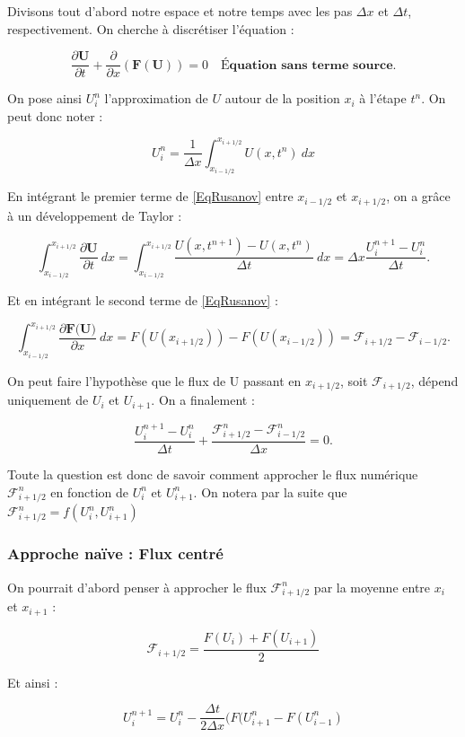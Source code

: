 \documentclass[
11pt, %
francais, %
singlespacing, %
headsepline, %
]{MastersDoctoralThesis} %
\begin{document}
Divisons tout d'abord notre espace et notre temps avec les pas $\Delta x$ et $\Delta t$, respectivement. On cherche à discrétiser l'équation : 

$$\frac{\partial\textbf{U}}{\partial t}+\frac{\partial}{\partial x}(\textbf{F} (\textbf{U})) = 0 \quad \textbf{Équation sans terme source} \label{EqRusanov} .$$

On pose ainsi $U_i ^n$ l'approximation de $U$ autour de la position $x_i$ à l'étape $t^n$. On peut donc noter :

$$ U_i ^n = \frac{1}{\Delta x}\int_{x_{i-1/2}}^{x_{i+1/2}} U(x,t^n) \ dx $$

En intégrant le premier terme de \ref{EqRusanov} entre $x_{i-1/2}$ et $x_{i+1/2}$, on a grâce à un développement de Taylor :

$$ \int_{x_{i-1/2}}^{x_{i+1/2}} \frac{\partial\textbf{U}}{\partial t} \ dx = \int_{x_{i-1/2}}^{x_{i+1/2}} \frac{U(x,t^{n+1}) - U(x,t^{n})}{\Delta t} \ dx = \Delta x \frac{ U_i ^{n+1} - U_i ^{n}}{\Delta t} .$$

Et en intégrant le second terme de \ref{EqRusanov} : 

$$ \int_{x_{i-1/2}}^{x_{i+1/2}} \frac{\partial\textbf{F(U)}}{\partial x} \ dx = F(U(x_{i+1/2})) - F(U(x_{i-1/2} )) = \mathcal{F}_{i+1/2} - \mathcal{F}_{i-1/2}.$$

On peut faire l'hypothèse que le flux de U passant en $x_{i+1/2}$, soit $\mathcal{F}_{i+1/2}$, dépend uniquement de $U_i$ et $U_{i+1}$. On a finalement :

$$ \frac{ U_i ^{n+1} - U_i ^{n}}{\Delta t} + \frac{ \mathcal{F}_{i+1/2} ^n - \mathcal{F}_{i-1/2} ^{n} }{\Delta x} = 0.$$

Toute la question est donc de savoir comment approcher le flux numérique $\mathcal{F}_{i+1/2} ^{n}$ en fonction de $U_i ^n$ et $U_{i+1} ^n$. On notera par la suite que $\mathcal{F}_{i+1/2} ^{n} = f(U_i ^n , U_{i+1} ^n)$

\subsubsection{Approche naïve : Flux centré }

On pourrait d'abord penser à approcher le flux $\mathcal{F}_{i+1/2} ^{n}$ par la moyenne entre $x_i$ et $x_{i+1}$ :

$$ \mathcal{F}_{i+1/2} = \frac{F(U_i) + F(U_{i+1})}{2} $$

Et ainsi :

$$ U_i ^{n+1} = U_i ^{n}  - \frac{\Delta t}{2 \Delta x} (F(U_{i+1} ^{n} - F(U_{i-1} ^{n} ) $$
\end{document}
